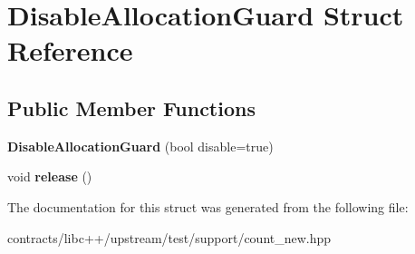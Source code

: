 \hypertarget{struct_disable_allocation_guard}{}\section{Disable\+Allocation\+Guard Struct Reference}
\label{struct_disable_allocation_guard}
\subsection*{Public Member Functions}
\begin{DoxyCompactItemize}
\item 
\mbox{\label{struct_disable_allocation_guard_a9344cc902009ac48b6da3701743eabed}} 
{\bfseries Disable\+Allocation\+Guard} (bool disable=true)
\item 
\mbox{\label{struct_disable_allocation_guard_ac2e91e9c0b259d366f217075ef6aaa40}} 
void {\bfseries release} ()
\end{DoxyCompactItemize}


The documentation for this struct was generated from the following file\+:\begin{DoxyCompactItemize}
\item 
contracts/libc++/upstream/test/support/count\+\_\+new.\+hpp\end{DoxyCompactItemize}
